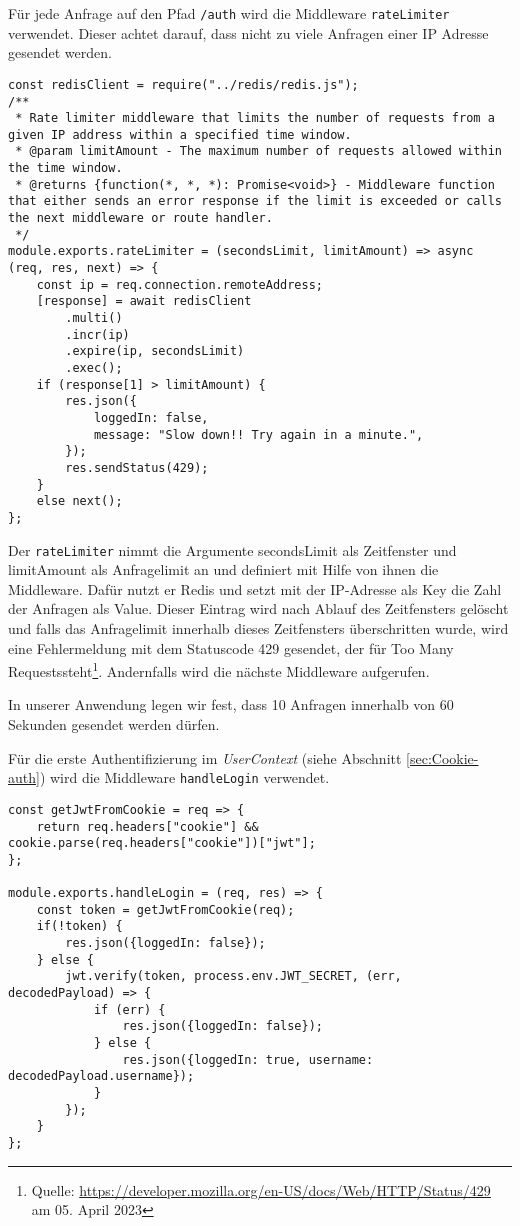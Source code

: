 Für jede Anfrage auf den Pfad \verb|/auth| wird die Middleware \verb|rateLimiter| verwendet. Dieser achtet darauf, dass nicht zu viele Anfragen einer IP Adresse gesendet werden. 

\begin{lstlisting}[style=codeStyle, caption={Die rateLimiter Middleware}, label={lst:rateLimiter}]
const redisClient = require("../redis/redis.js");
/**
 * Rate limiter middleware that limits the number of requests from a given IP address within a specified time window.
 * @param limitAmount - The maximum number of requests allowed within the time window.
 * @returns {function(*, *, *): Promise<void>} - Middleware function that either sends an error response if the limit is exceeded or calls the next middleware or route handler.
 */
module.exports.rateLimiter = (secondsLimit, limitAmount) => async (req, res, next) => {
    const ip = req.connection.remoteAddress;
    [response] = await redisClient
        .multi()
        .incr(ip)
        .expire(ip, secondsLimit)
        .exec();
    if (response[1] > limitAmount) {
        res.json({
            loggedIn: false,
            message: "Slow down!! Try again in a minute.",
        });
        res.sendStatus(429);
    }
    else next();
};
\end{lstlisting}

Der \verb|rateLimiter| nimmt die Argumente secondsLimit als Zeitfenster und limitAmount als Anfragelimit an und definiert mit Hilfe von ihnen die Middleware. Dafür nutzt er Redis und setzt mit der IP-Adresse als Key die Zahl der Anfragen als Value. Dieser Eintrag wird nach Ablauf des Zeitfensters gelöscht und falls das Anfragelimit innerhalb dieses Zeitfensters überschritten wurde, wird eine Fehlermeldung mit dem Statuscode 429 gesendet, der für \glqq Too Many Requests\grqq{ }steht\footnote{Quelle: \url{https://developer.mozilla.org/en-US/docs/Web/HTTP/Status/429} am 05. April 2023}. Andernfalls wird die nächste Middleware aufgerufen.

In unserer Anwendung legen wir fest, dass 10 Anfragen innerhalb von 60 Sekunden gesendet werden dürfen.

Für die erste Authentifizierung im \textit{UserContext} (siehe Abschnitt \ref{sec:Cookie-auth}) wird die Middleware \verb|handleLogin| verwendet.

\begin{lstlisting}[style=codeStyle, caption={Die handleLogin Middleware zum Authentifizieren mit Cookie}, label={lst:handleLogin}]
const getJwtFromCookie = req => {
    return req.headers["cookie"] && cookie.parse(req.headers["cookie"])["jwt"];
};

module.exports.handleLogin = (req, res) => {
    const token = getJwtFromCookie(req);
    if(!token) {
        res.json({loggedIn: false});
    } else {
        jwt.verify(token, process.env.JWT_SECRET, (err, decodedPayload) => {
            if (err) {
                res.json({loggedIn: false});
            } else {
                res.json({loggedIn: true, username: decodedPayload.username});
            }
        });
    }
};
\end{lstlisting}

